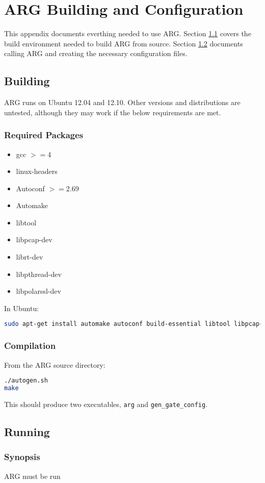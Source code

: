 \chapter{\ac{ARG} Building and Configuration}
\label{chp:argconf}

\par This appendix documents everthing needed to use \ac{ARG}. Section \ref{sec:arg_env} covers the build environment needed to build \ac{ARG} from source. Section \ref{sec:arg_cmd} documents calling \ac{ARG} and creating the necessary configuration files.

\section{Building}
\label{sec:arg_env}
\par \ac{ARG} runs on Ubuntu 12.04 and 12.10. Other versions and distributions are untested, although they may work if the below requirements are met. 

\subsection{Required Packages}
{\singlespace
\begin{itemize}
\item gcc $>=$4
\item linux-headers
\item Autoconf $>=$2.69
\item Automake
\item libtool
\item libpcap-dev
\item librt-dev
\item libpthread-dev
\item libpolarssl-dev
\end{itemize}
}

\par In Ubuntu:
\begin{lstlisting}[language=bash]
sudo apt-get install automake autoconf build-essential libtool libpcap-dev libpolarssl-dev
\end{lstlisting}

\subsection{Compilation}
\par From the \ac{ARG} source directory:
\begin{lstlisting}[language=bash]
./autogen.sh
make
\end{lstlisting}

\par This should produce two executables, \texttt{arg} and \texttt{gen\_gate\_config}.

\section{Running}
\label{sec:arg_cmd}
\subsection{Synopsis}
\par \ac{ARG} must be run 

